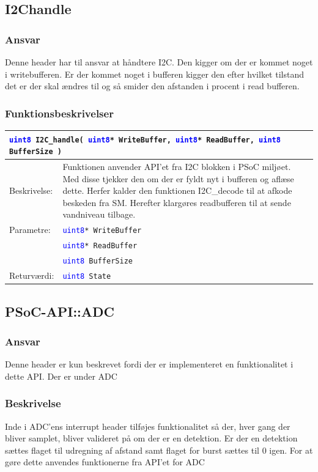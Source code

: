 \subsection{I2Chandle}
\subsubsection{Ansvar}
Denne header har til ansvar at håndtere I2C. Den kigger om der er kommet noget i writebufferen. Er der kommet noget i bufferen kigger den efter hvilket tilstand det er der skal ændres til og så smider den afstanden i procent i read bufferen.
\subsubsection{Funktionsbeskrivelser}
\begin{table}[H]
\begin{tabular}{l p{12.5cm} }
\multicolumn{2}{l}{\texttt{\textcolor{blue}{uint8} I2C\_handle(  \texttt{\textcolor{blue}{uint8}* WriteBuffer}, 
\texttt{\textcolor{blue}{uint8}* ReadBuffer}, \texttt{\textcolor{blue}{uint8} BufferSize} )}} \\
\hline
Beskrivelse:& Funktionen anvender API'et fra I2C blokken i PSoC miljøet. Med disse tjekker den om der er fyldt nyt i bufferen og aflæse dette. Herfer kalder den funktionen I2C\_decode til at afkode beskeden fra SM. Herefter klargøres readbufferen til at sende vandniveau tilbage. \\
Parametre:&\texttt{\textcolor{blue}{uint8}* WriteBuffer}\\
&\texttt{\textcolor{blue}{uint8}* ReadBuffer}\\
&\texttt{\textcolor{blue}{uint8} BufferSize} \\
Returværdi:&\texttt{\textcolor{blue}{uint8} State}\\
\end{tabular}
\end{table}

\subsection{PSoC-API::ADC}
\subsubsection{Ansvar}
Denne header er kun beskrevet fordi der er implementeret en funktionalitet i dette API. Der er under ADC
\subsubsection{Beskrivelse}
Inde i ADC'ens interrupt header tilføjes funktionalitet så der, hver gang der bliver samplet, bliver valideret på om der er en detektion. Er der en detektion sættes flaget til udregning af afstand samt flaget for burst sættes til 0 igen. For at gøre dette anvendes funktionerne fra API'et for ADC

